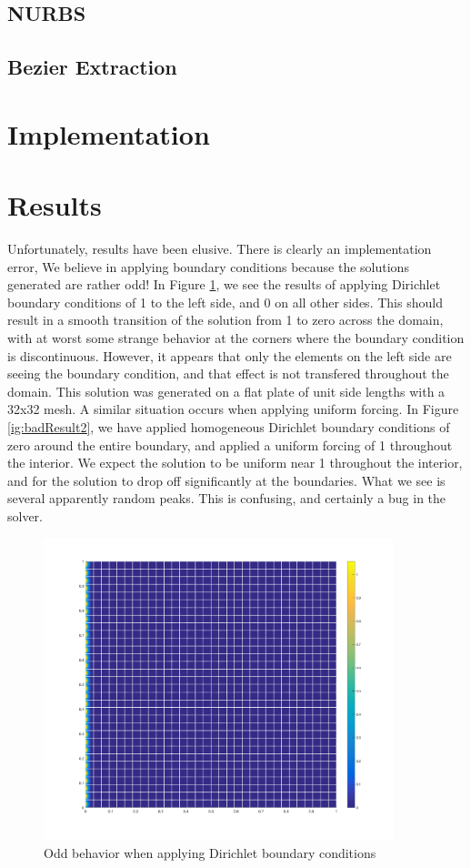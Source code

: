 \documentclass[preprint,1p,12pt]{elsarticle}
\begin{document}
\subsection{NURBS}


\subsection{Bezier Extraction}


\section{Implementation}


\section{Results}
Unfortunately, results have been elusive. There is clearly an implementation error, We believe in applying boundary conditions because the solutions generated are rather odd! In Figure \ref{fig:badResult}, we see the results of applying Dirichlet boundary conditions of 1 to the left side, and 0 on all other sides. This should result in a smooth transition of the solution from 1 to zero across the domain, with at worst some strange behavior at the corners where the boundary condition is discontinuous. However, it appears that only the elements on the left side are seeing the boundary condition, and that effect is not transfered throughout the domain. This solution was generated on a flat plate of unit side lengths with a 32x32 mesh. A similar situation occurs when applying uniform forcing. In Figure \ref{ig:badResult2}, we have applied homogeneous Dirichlet boundary conditions of zero around the entire boundary, and applied a uniform forcing of 1 throughout the interior. We expect the solution to be uniform near 1 throughout the interior, and for the solution to drop off significantly at the boundaries. What we see is several apparently random peaks. This is confusing, and certainly a bug in the solver. 

\begin{figure}[!htbp]
  \centerline{\includegraphics[width=4in]{./figures/badSolution}}
  \caption{Odd behavior when applying Dirichlet boundary conditions}
  \label{fig:badResult}
\end{figure}
\end{document}
